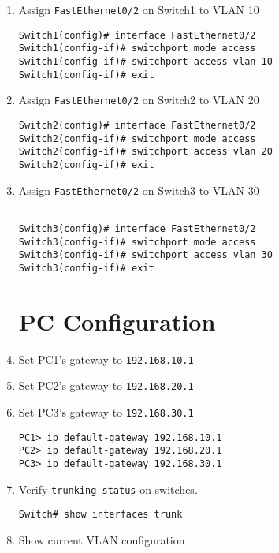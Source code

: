\documentclass[a4paper]{book}
\begin{document}
\begin{enumerate}
\item{Assign \texttt{FastEthernet0/2} on Switch1 to VLAN 10}

\begin{lstlisting}
Switch1(config)# interface FastEthernet0/2
Switch1(config-if)# switchport mode access
Switch1(config-if)# switchport access vlan 10
Switch1(config-if)# exit
\end{lstlisting}

\item{Assign \texttt{FastEthernet0/2} on Switch2 to VLAN 20}

\begin{lstlisting}
Switch2(config)# interface FastEthernet0/2
Switch2(config-if)# switchport mode access
Switch2(config-if)# switchport access vlan 20
Switch2(config-if)# exit
\end{lstlisting}

\item{Assign \texttt{FastEthernet0/2} on Switch3 to VLAN 30}
\begin{lstlisting}

Switch3(config)# interface FastEthernet0/2
Switch3(config-if)# switchport mode access
Switch3(config-if)# switchport access vlan 30
Switch3(config-if)# exit
\end{lstlisting}

\section{PC Configuration}

\item{Set PC1's gateway to \texttt{192.168.10.1}}
\item{Set PC2's gateway to \texttt{192.168.20.1}}
\item{Set PC3's gateway to \texttt{192.168.30.1}}

\begin{lstlisting}
PC1> ip default-gateway 192.168.10.1
PC2> ip default-gateway 192.168.20.1
PC3> ip default-gateway 192.168.30.1
\end{lstlisting}

\item{Verify \texttt{trunking status} on switches.}

\begin{lstlisting}
Switch# show interfaces trunk
\end{lstlisting}

\item{Show current VLAN configuration}


\end{enumerate}
\end{document}
